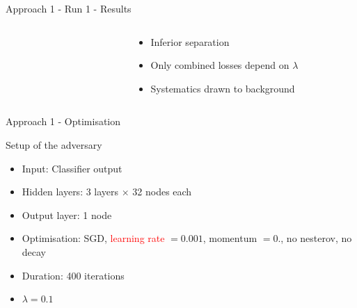 \begin{frame}{Approach 1 - Run 1 - Results}
\begin{columns}
\begin{column}{0.5\textwidth}
\begin{figure}
    \end{figure}
    \end{column}
    \begin{column}{0.5\textwidth}
    \begin{itemize}
        \item Inferior separation
        \item Only combined losses depend on $\lambda$
        \item Systematics drawn to background
    \end{itemize}
    \end{column}
    \end{columns}
\end{frame}

\begin{frame}{Approach 1 - Optimisation}
\begin{block}{Setup of the adversary}
    \begin{itemize}
    \item Input: Classifier output
    \item Hidden layers: \num{3} \ELU layers $\times$ \num{32} nodes each
    \item Output layer: \num{1} \SIGMOID node
    \item Optimisation: SGD, \textcolor{red}{learning rate} $=0.001$, momentum $=0.$, no nesterov, no decay
    \item Duration: 400 iterations
    \item $\lambda = 0.1$
    \end{itemize}
    \end{block}
\end{frame}

